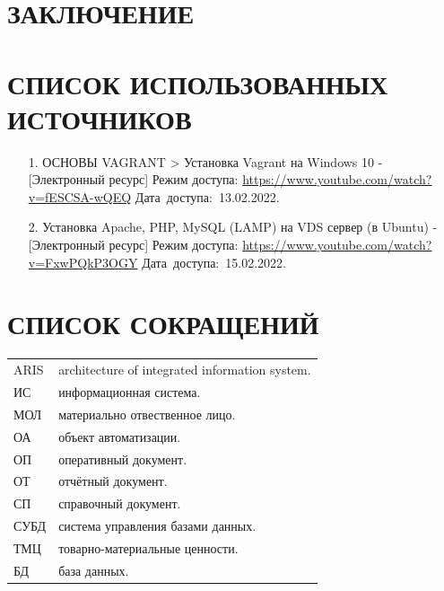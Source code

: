 \documentclass[12pt, a4paper, simple]{eskdtext}
\begin{document}
    \newpage
    \section*{ЗАКЛЮЧЕНИЕ}
    \newpage

    \newpage
    \section*{СПИСОК ИСПОЛЬЗОВАННЫХ ИСТОЧНИКОВ}
    \begin{enumerate}
        \item[1.] ОСНОВЫ VAGRANT > Установка Vagrant на Windows 10 - [Электронный ресурс]
        Режим доступа: \url{https://www.youtube.com/watch?v=fESCSA-wQEQ}
        Дата~доступа:~13.02.2022.
        \item[2.] Установка Apache, PHP, MySQL (LAMP) на VDS сервер (в Ubuntu) - [Электронный ресурс]
        Режим доступа: \url{https://www.youtube.com/watch?v=FxwPQkP3OGY}
        Дата~доступа:~15.02.2022.
    \end{enumerate}
    \newpage

    \newpage
    \section*{СПИСОК СОКРАЩЕНИЙ}
    
    \begin{tabular}{ll} 
        ARIS    & architecture of integrated information system.\\
        ИС      & информационная система.\\
        МОЛ     & материально отвественное лицо.\\
        ОА      & объект автоматизации.\\
        ОП      & оперативный документ.\\
        ОТ      & отчётный документ.\\
        СП      & справочный документ.\\
        СУБД    & система управления базами данных.\\
        ТМЦ     & товарно-материальные ценности.\\
        БД      & база данных.\\
    \end{tabular}
    
    \newpage
\end{document}
